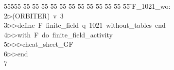%
%
\begin{tabbing}
55555 \= 55 \= 55 \= 55 \= 55 \= 55 \= 55 \= 55 \= 55 \= 55 \= 55 \= 55 \= 55 \= \>F\_1021\_wo:\\[0pt]
2\>$\triangleright$\>(ORBITER)\ v\ 3\ \\[0pt]
3\>$\triangleright$\>$\triangleright$\>define\ F\ finite\_field\ q\ 1021\ without\_tables\ end\ \\[0pt]
4\>$\triangleright$\>$\triangleright$\>with\ F\ do\ finite\_field\_activity\ \\[0pt]
5\>$\triangleright$\>$\triangleright$\>$\triangleright$\>cheat\_sheet\_GF\ \\[0pt]
6\>$\triangleright$\>$\triangleright$\>end\\[0pt]
7\>\end{tabbing}
